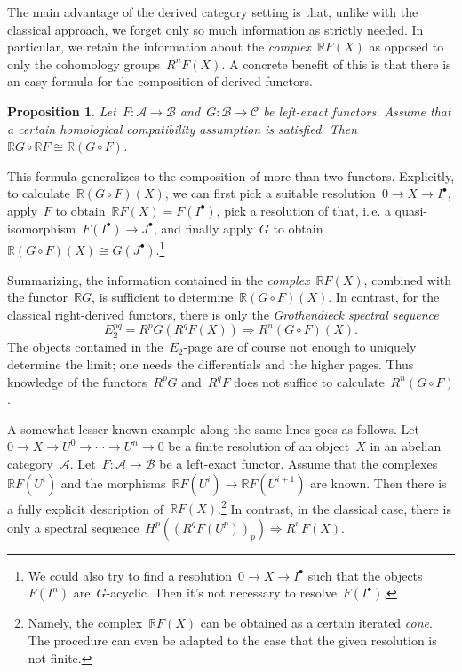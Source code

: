 \documentclass{amsart}
\makeatletter
\theoremstyle{definition}
\theoremstyle{plain}
\newtheorem{prop}[defn]{Proposition}
\theoremstyle{remark}
\newcommand{\A}{\mathcal{A}}
\newcommand{\B}{\mathcal{B}}
\newcommand{\C}{\mathcal{C}}
\newcommand{\RR}{\mathbb{R}}
\newcommand{\?}{\,{:}\,}
\renewcommand{\_}{\mathpunct{.}\,}
\newcommand{\ie}{i.\,e.\@\xspace}
\makeatother
\begin{document}
The main advantage of the derived category setting is that, unlike with the
classical approach, we forget only so much information as strictly needed.
In particular, we retain the information about the \emph{complex}~$\RR F(X)$ as
opposed to only the cohomology groups~$R^n F(X)$. A concrete benefit of this is
that there is an easy formula for the composition of derived functors.

\begin{prop}Let~$F : \A \to \B$ and~$G : \B \to \C$ be left-exact functors.
Assume that a certain homological compatibility assumption is satisfied.
Then~$\RR G \circ \RR F \cong \RR (G \circ F)$.\end{prop}

This formula generalizes to the composition of more than two functors.
Explicitly, to calculate~$\RR (G \circ F)(X)$, we can first pick a suitable
resolution~$0 \to X \to I^\bullet$, apply~$F$ to obtain~$\RR F(X) =
F(I^\bullet)$, pick a resolution of that, \ie a quasi-isomorphism~$F(I^\bullet)
\to J^\bullet$, and finally apply~$G$ to obtain~$\RR (G \circ F)(X) \cong
G(J^\bullet)$.\footnote{We could also try to find a resolution~$0 \to X \to
I^\bullet$ such that the objects~$F(I^n)$ are~$G$-acyclic. Then it's not
necessary to resolve~$F(I^\bullet)$.}

Summarizing, the information contained in the \emph{complex}~$\RR F(X)$, combined with the functor~$\RR G$, is
sufficient to determine~$\RR (G \circ F)(X)$. In contrast, for the classical
right-derived functors, there is only the \emph{Grothendieck spectral sequence}
\[ E_2^{pq} = R^p G(R^q F(X)) \Longrightarrow R^n (G \circ F)(X). \]
The objects contained in the~$E_2$-page are of course not enough to uniquely
determine the limit; one needs the differentials and the higher pages. Thus
knowledge of the functors~$R^p G$ and~$R^q F$ does not suffice to
calculate~$R^n(G \circ F)$.

A somewhat lesser-known example along the same lines goes as follows. Let~$0
\to X \to U^0 \to \cdots \to U^n \to 0$ be a finite resolution of an object~$X$ in an abelian
category~$\A$. Let~$F : \A \to \B$ be a left-exact functor. Assume that the
complexes~$\RR F(U^i)$ and the morphisms~$\RR F(U^i) \to \RR F(U^{i+1})$ are
known. Then there is a fully explicit description of~$\RR F(X)$.\footnote{Namely,
the complex~$\RR F(X)$ can be obtained as a certain iterated \emph{cone}. The
procedure can even be adapted to the case that the given resolution is not
finite.}
In contrast, in the classical case, there is only a spectral sequence~$H^p((R^q
F(U^p))_p) \Rightarrow R^n F(X)$.
\end{document}
